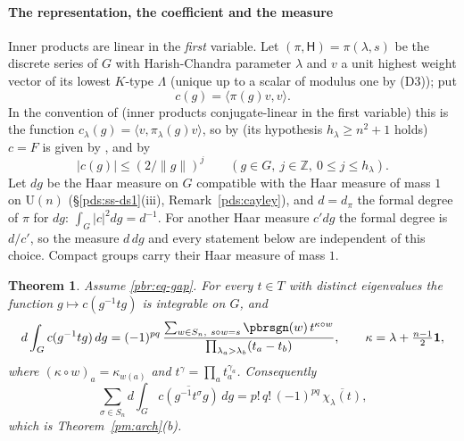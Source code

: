 \documentclass[10pt]{amsart}
\newtheorem{theorem}{Theorem}[section]
\theoremstyle{definition}
\theoremstyle{remark}
\newcommand{\Z}{\mathbb Z}
\providecommand{\auU}{\mathrm U}
\providecommand{\aubar}[1]{\overline{#1}}
\begin{document}
\paragraph*{The representation, the coefficient and the measure}
Inner products are linear in the \emph{first} variable. Let $(\pi,\mathsf H)=\pi(\lambda,s)$ be the
discrete series of $G$ with Harish-Chandra parameter $\lambda$ and $v$ a unit highest weight vector
of its lowest $K$-type $\Lambda$ (unique up to a scalar of modulus one by (D3)); put
\begin{equation}\label{pbr:eq-c}
c(g)=\langle\pi(g)v,v\rangle .
\end{equation}
In the convention of {\cite[\S3.2]{P49}} (inner products conjugate-linear in the first variable) this is
the function $c_\lambda(g)=\langle v,\pi_\lambda(g)v\rangle$, so by {\cite[Theorem~3.17]{P49}} (its
hypothesis $h_\lambda\ge n^2+1$ holds) $c=F$ is given by {\cite[(14)]{P49}}, and by
{\cite[Lemma~3.25]{P49}}
\begin{equation}\label{pbr:eq-decay}
|c(g)|\le(2/\|g\|)^{j}\qquad(g\in G,\ j\in\Z,\ 0\le j\le h_\lambda).
\end{equation}
Let $dg$ be the Haar measure on $G$ compatible with the Haar measure of mass $1$ on $\auU(n)$
(\S\ref{pds:ss-ds1}(iii), Remark~\ref{pds:cayley}), and $d=d_\pi$ the formal degree of $\pi$ for
$dg$: $\int_G|c|^2dg=d^{-1}$. For another Haar measure $c'dg$ the formal degree is $d/c'$, so the
measure $d\,dg$ and every statement below are independent of this choice. Compact groups carry
their Haar measure of mass $1$.

\begin{theorem}\label{pbr:main}
Assume \eqref{pbr:eq-gap}. For every $t\in T$ with distinct eigenvalues the function
$g\mapsto c(g^{-1}tg)$ is integrable on $G$, and
\begin{equation}\label{pbr:eq-unstable}
d\int_Gc(g^{-1}tg)\,dg=(-1)^{pq}\,\frac{\sum_{w\in S_n,\ s\circ w=s}\pbrsgn(w)\,t^{\kappa\circ w}}
{\prod_{\lambda_a>\lambda_b}(t_a-t_b)},\qquad\kappa=\lambda+\tfrac{n-1}2\mathbf 1,
\end{equation}
where $(\kappa\circ w)_a=\kappa_{w(a)}$ and $t^\gamma=\prod_at_a^{\gamma_a}$. Consequently
\begin{equation}\label{pbr:eq-stable}
\sum_{\sigma\in S_n}d\int_G\aubar{c(g^{-1}t^\sigma g)}\,dg=p!\,q!\,(-1)^{pq}\,\aubar{\chi_\lambda(t)} ,
\end{equation}
which is Theorem~\ref{pm:arch}(b).
\end{theorem}
\end{document}
